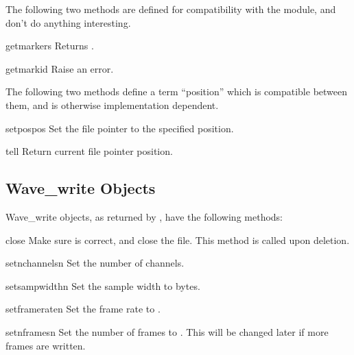The following two methods are defined for compatibility with the
 module, and don't do anything interesting.

\begin{methoddesc}{getmarkers}{}
Returns .
\end{methoddesc}

\begin{methoddesc}{getmark}{id}
Raise an error.
\end{methoddesc}

The following two methods define a term ``position'' which is compatible
between them, and is otherwise implementation dependent.

\begin{methoddesc}{setpos}{pos}
Set the file pointer to the specified position.
\end{methoddesc}

\begin{methoddesc}{tell}{}
Return current file pointer position.
\end{methoddesc}


\subsection{Wave_write Objects \label{Wave-write-objects}}

Wave_write objects, as returned by , have the
following methods:

\begin{methoddesc}{close}{}
Make sure  is correct, and close the file.
This method is called upon deletion.
\end{methoddesc}

\begin{methoddesc}{setnchannels}{n}
Set the number of channels.
\end{methoddesc}

\begin{methoddesc}{setsampwidth}{n}
Set the sample width to  bytes.
\end{methoddesc}

\begin{methoddesc}{setframerate}{n}
Set the frame rate to .
\end{methoddesc}

\begin{methoddesc}{setnframes}{n}
Set the number of frames to . This will be changed later if
more frames are written.
\end{methoddesc}

